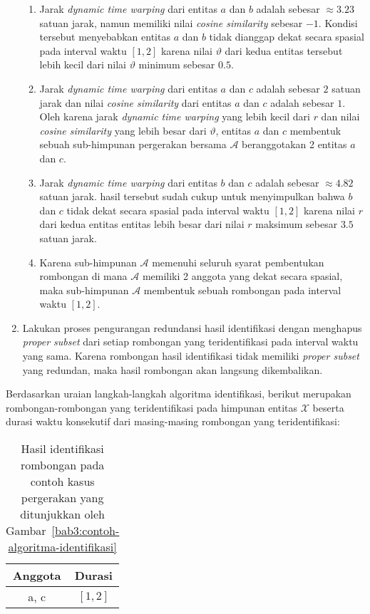 \begin{enumerate}
    \begin{enumerate}
        \item Jarak \textit{dynamic time warping} dari entitas $a$ dan $b$ adalah sebesar $\approx 3.23$ satuan jarak, namun memiliki nilai \textit{cosine similarity} sebesar $-1$. Kondisi tersebut menyebabkan entitas $a$ dan $b$ tidak dianggap dekat secara spasial pada interval waktu $[1, 2]$ karena nilai $\vartheta$ dari kedua entitas tersebut lebih kecil dari nilai $\vartheta$ minimum sebesar $0.5$.
        \item Jarak \textit{dynamic time warping} dari entitas $a$ dan $c$ adalah sebesar $2$ satuan jarak dan nilai \textit{cosine similarity} dari entitas $a$ dan $c$ adalah sebesar $1$. Oleh karena jarak \textit{dynamic time warping} yang lebih kecil dari $r$ dan nilai \textit{cosine similarity} yang lebih besar dari $\vartheta$, entitas $a$ dan $c$ membentuk sebuah sub-himpunan pergerakan bersama $\mathcal{A}$ beranggotakan 2 entitas $a$ dan $c$.
        \item Jarak \textit{dynamic time warping} dari entitas $b$ dan $c$ adalah sebesar $\approx 4.82$ satuan jarak. hasil tersebut sudah cukup untuk menyimpulkan bahwa $b$ dan $c$ tidak dekat secara spasial pada interval waktu $[1, 2]$ karena nilai $r$ dari kedua entitas entitas lebih besar dari nilai $r$ maksimum sebesar $3.5$ satuan jarak.
        \item Karena sub-himpunan $\mathcal{A}$ memenuhi seluruh syarat pembentukan rombongan di mana $\mathcal{A}$ memiliki 2 anggota yang dekat secara spasial, maka sub-himpunan $\mathcal{A}$ membentuk sebuah rombongan pada interval waktu $[1, 2]$.
    \end{enumerate}
    
    \item Lakukan proses pengurangan redundansi hasil identifikasi dengan menghapus \textit{proper subset} dari setiap rombongan yang teridentifikasi pada interval waktu yang sama. Karena rombongan hasil identifikasi tidak memiliki \textit{proper subset} yang redundan, maka hasil rombongan akan langsung dikembalikan.
\end{enumerate}

Berdasarkan uraian langkah-langkah algoritma identifikasi, berikut merupakan rombongan-rombongan yang teridentifikasi pada himpunan entitas $\mathcal{X}$ beserta durasi waktu konsekutif dari masing-masing rombongan yang teridentifikasi:

\begin{table}[h]
    \centering
    \captionsetup{width=0.6\textwidth}
    \caption{Hasil identifikasi rombongan pada contoh kasus pergerakan yang ditunjukkan oleh Gambar~\ref{bab3:contoh-algoritma-identifikasi}}
    \begin{tabular}{|c|c|}
        \hline
        Anggota & Durasi \\
        \hline
        a, c & $[1, 2]$ \\
        \hline
    \end{tabular}
    \label{bab6:contoh-identifikasi-non-redundan}
\end{table}

